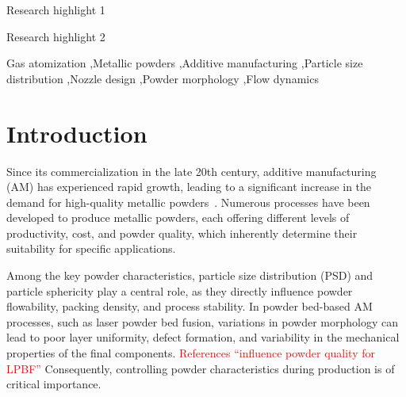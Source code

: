 \documentclass[final,5p,times,twocolumn]{elsarticle}
\begin{document}
\begin{frontmatter}
\begin{abstract}
\end{abstract}

\begin{graphicalabstract}
\end{graphicalabstract}

\begin{highlights}
\item Research highlight 1
\item Research highlight 2
\end{highlights}

\begin{keyword}
Gas atomization \sep Metallic powders \sep Additive manufacturing \sep Particle size distribution \sep Nozzle design \sep Powder morphology \sep Flow dynamics


\end{keyword}

\end{frontmatter}




\section{Introduction}
\label{}

Since its commercialization in the late 20th century, additive manufacturing (AM) has experienced rapid growth, leading to a significant increase in the demand for high-quality metallic powders~\cite{Feng2024PreparationAdditive}. Numerous processes have been developed to produce metallic powders, each offering different levels of productivity, cost, and powder quality, which inherently determine their suitability for specific applications.

Among the key powder characteristics, particle size distribution (PSD) and particle sphericity play a central role, as they directly influence powder flowability, packing density, and process stability. In powder 
bed-based AM processes, such as laser powder bed fusion, variations in powder morphology can lead to poor layer uniformity, defect formation, and variability in the mechanical properties of the final components.
\textcolor{red}{References ``influence powder quality for LPBF''}
Consequently, controlling powder characteristics during production is of critical importance.
\end{document}
